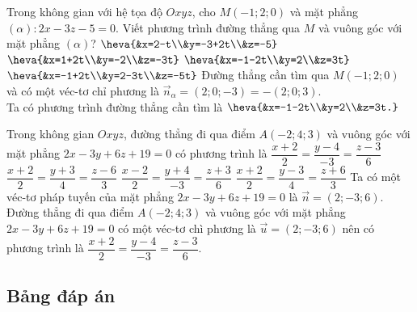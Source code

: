 \begin{ex}%
	Trong không gian với hệ tọa độ $O x y z$, cho $M(-1;2;0)$ và mặt phẳng $(\alpha)\colon 2x-3z-5=0$. Viết phương trình đường thẳng qua $M$ và vuông góc với mặt phẳng $(\alpha)$?
	\choice 
	{$\heva{&x=2-t\\&y=-3+2t\\&z=-5}$}
	{$\heva{&x=1+2t\\&y=-2\\&z=-3t}$}
	{\True $\heva{&x=-1-2t\\&y=2\\&z=3t}$}
	{$\heva{&x=-1+2t\\&y=2-3t\\&z=-5t}$}
		\loigiai 
	{
	Đường thẳng cần tìm qua $M(-1;2;0)$ và có một véc-tơ chỉ phương là $\vec{n}_{\alpha}=(2;0;-3)=-(2;0;3)$.\\
	Ta có phương trình đường thẳng cần tìm là $\heva{&x=-1-2t\\&y=2\\&z=3t.}$
					}
				\end{ex}
			
\begin{ex}%
	Trong không gian $O x y z$, đường thẳng đi qua điểm $A(-2;4;3)$ và vuông góc với mặt phẳng $2x-3y+6z+19=0$ có phương trình là 
	\choice 
	{\True $\dfrac{x+2}{2}=\dfrac{y-4}{-3}=\dfrac{z-3}{6}$}
	{$\dfrac{x+2}{2}=\dfrac{y+3}{4}=\dfrac{z-6}{3}$}
	{$\dfrac{x-2}{2}=\dfrac{y+4}{-3}=\dfrac{z+3}{6}$}
	{$\dfrac{x+2}{2}=\dfrac{y-3}{4}=\dfrac{z+6}{3}$}
	\loigiai 
	{
Ta có một véc-tơ pháp tuyến của mặt phẳng $2x-3y+6z+19=0$ là $\vec{n}=(2;-3;6)$.\\
Đường thẳng đi qua điểm $A(-2;4;3)$ và vuông góc với mặt phẳng $2x-3y+6z+19=0$ có một véc-tơ chì phương là $\vec{u}=(2;-3;6)$ nên có phương trình là $\dfrac{x+2}{2}=\dfrac{y-4}{-3}=\dfrac{z-3}{6}$.	
	}
\end{ex}
\subsection{Bảng đáp án}


